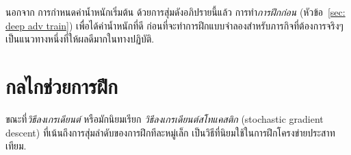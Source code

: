 นอกจาก
การกำหนดค่าน้ำหนักเริ่มต้น
ด้วยการสุ่มดังอภิปรายนี้แล้ว
การทำ\textit{การฝึกก่อน} (หัวข้อ~\ref{sec: deep adv train})
เพื่อได้ค่าน้ำหนักที่ดี ก่อนที่จะทำการฝึกแบบจำลองสำหรับภารกิจที่ต้องการจริงๆ เป็นแนวทางหนึ่งที่ให้ผลดีมากในทางปฏิบัติ.



%
%
%
%
%
%
%
%
%




\section{กลไกช่วยการฝึก}
\label{sec: adv training opt}

ขณะที่\textit{วิธีลงเกรเดียนต์}
หรือมักนิยมเรียก
\textit{วิธีลงเกรเดียนต์สโทแคสติก} (stochastic gradient descent)
ที่เน้นถึงการสุ่มลำดับของการฝึกทีละหมู่เล็ก
เป็นวิธีที่นิยมใช้ในการฝึกโครงข่ายประสาทเทียม.

